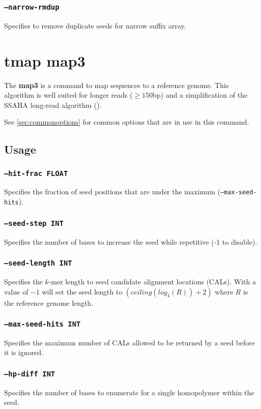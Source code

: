 \documentclass[a4paper,12pt]{book}
\newcommand{\TT}[1]{{\tt #1}} %
\newcommand{\BF}[1]{{\bf #1}} %
\begin{document}
\subsubsection{\TT{--narrow-rmdup}}
Specifies to remove duplicate seeds for narrow suffix array.

\section{tmap map3}
\label{sec:map3}
The \BF{map3} is a command to map sequences to a reference genome.
This algorithm is well suited for longer reads ($\geq 150$bp) and a simplification of the SSAHA long-read algorithm (\cite{SSAHA}).

See \autoref{sec:commonoptions} for common options that are in use in this command.

\subsection{Usage}

\subsubsection{\TT{--hit-frac FLOAT}}
Specifies the fraction of seed positions that are under the maximum (\TT{--max-seed-hits}).

\subsubsection{\TT{--seed-step INT}}
Specifies the number of bases to increase the seed while repetitive (-1 to disable).


\subsubsection{\TT{--seed-length INT}}
Specifies the $k$-mer length to seed candidate alignment locations (CALs).
With a value of $-1$ will set the seed length to $\left(ceiling(log_4(R)) + 2\right)$ where $R$ is the reference genome length.

\subsubsection{\TT{--max-seed-hits INT}}
Specifies the maximum number of CALs allowed to be returned by a seed before it is ignored.

\subsubsection{\TT{--hp-diff INT}}
Specifies the number of bases to enumerate for a single homopolymer within the seed.
\end{document}

